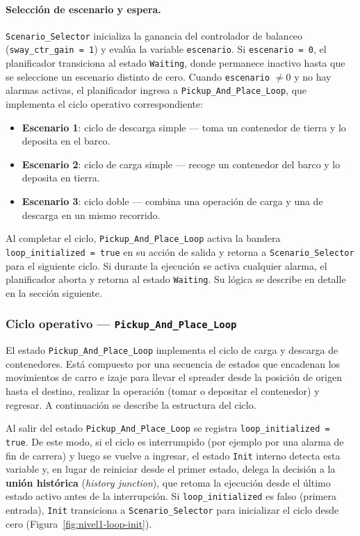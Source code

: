 \documentclass[12pt, a4paper]{article}
\begin{document}
\paragraph{Selección de escenario y espera.}\leavevmode

\texttt{Scenario\_Selector} inicializa la ganancia del controlador de balanceo
(\texttt{sway\_ctr\_gain = 1}) y evalúa la variable \texttt{escenario}. Si
\texttt{escenario = 0}, el planificador transiciona al estado \texttt{Waiting}, donde
permanece inactivo hasta que se seleccione un escenario distinto de cero. Cuando
\texttt{escenario} $\neq 0$ y no hay alarmas activas, el planificador ingresa a
\texttt{Pickup\_And\_Place\_Loop}, que implementa el ciclo operativo correspondiente:

\begin{itemize}
    \item \textbf{Escenario 1}: ciclo de descarga simple — toma un contenedor de tierra
    y lo deposita en el barco.
    \item \textbf{Escenario 2}: ciclo de carga simple — recoge un contenedor del barco
    y lo deposita en tierra.
    \item \textbf{Escenario 3}: ciclo doble — combina una operación de carga y una de
    descarga en un mismo recorrido.
\end{itemize}

Al completar el ciclo, \texttt{Pickup\_And\_Place\_Loop} activa la bandera
\texttt{loop\_initialized = true} en su acción de salida y retorna a
\texttt{Scenario\_Selector} para el siguiente ciclo. Si durante la ejecución se activa
cualquier alarma, el planificador aborta y retorna al estado \texttt{Waiting}.
Su lógica se describe en detalle en la sección siguiente.

\subsubsection{Ciclo operativo — \texttt{Pickup\_And\_Place\_Loop}}

El estado \texttt{Pickup\_And\_Place\_Loop} implementa el ciclo de carga y descarga
de contenedores. Está compuesto por una secuencia de estados que encadenan los
movimientos de carro e izaje para llevar el spreader desde la posición de origen hasta
el destino, realizar la operación (tomar o depositar el contenedor) y regresar.
A continuación se describe la estructura del ciclo.

Al salir del estado \texttt{Pickup\_And\_Place\_Loop} se registra
\texttt{loop\_initialized = true}. De este modo, si el ciclo es interrumpido (por
ejemplo por una alarma de fin de carrera) y luego se vuelve a ingresar, el estado
\texttt{Init} interno detecta esta variable y, en lugar de reiniciar desde el primer
estado, delega la decisión a la \textbf{unión histórica} (\textit{history junction}),
que retoma la ejecución desde el último estado activo antes de la interrupción. Si
\texttt{loop\_initialized} es falso (primera entrada), \texttt{Init} transiciona a
\texttt{Scenario\_Selector} para inicializar el ciclo desde cero
(Figura~\ref{fig:nivel1-loop-init}).
\end{document}
